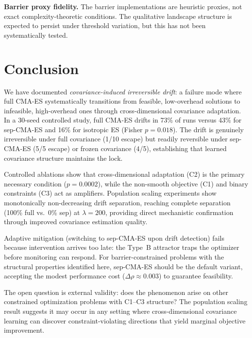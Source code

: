 \documentclass[twoside,11pt]{article}
\begin{document}
\textbf{Barrier proxy fidelity.} The barrier implementations are heuristic
proxies, not exact complexity-theoretic conditions. The qualitative landscape
structure is expected to persist under threshold variation, but this has not
been systematically tested.

\section{Conclusion}
\label{sec:conclusion}

We have documented \emph{covariance-induced irreversible drift}: a failure mode
where full CMA-ES systematically transitions from feasible, low-overhead
solutions to infeasible, high-overhead ones through cross-dimensional
covariance adaptation. In a 30-seed controlled study, full CMA-ES drifts in
73\% of runs versus 43\% for sep-CMA-ES and 16\% for isotropic ES (Fisher
$p = 0.018$). The drift is genuinely irreversible under full covariance
(1/10 escape) but readily reversible under sep-CMA-ES (5/5 escape) or
frozen covariance (4/5), establishing that learned covariance structure
maintains the lock.

Controlled ablations show that cross-dimensional adaptation (C2) is the
primary necessary condition ($p = 0.0002$), while the non-smooth objective
(C1) and binary constraints (C3) act as amplifiers. Population scaling
experiments show monotonically non-decreasing drift separation, reaching complete
separation (100\% full vs.\ 0\% sep) at $\lambda = 200$, providing direct
mechanistic confirmation through improved covariance estimation quality.

Adaptive mitigation (switching to sep-CMA-ES upon drift detection) fails
because intervention arrives too late: the Type~B attractor traps the
optimizer before monitoring can respond. For
barrier-constrained problems with the structural properties identified here,
sep-CMA-ES should be the default variant, accepting the modest performance
cost ($\Delta\rho \approx 0.003$) to guarantee feasibility.

The open question is external validity: does the phenomenon
arise on other constrained optimization problems with C1--C3 structure?
The population scaling result suggests it may occur in any setting
where cross-dimensional covariance learning can discover constraint-violating
directions that yield marginal objective improvement.
\end{document}
